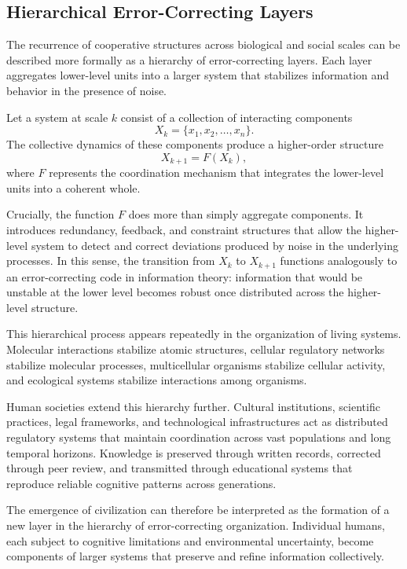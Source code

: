 \documentclass[12pt]{article}
\begin{document}
\subsection{Hierarchical Error-Correcting Layers}

The recurrence of cooperative structures across biological and social scales can be described more formally as a hierarchy of error-correcting layers. Each layer aggregates lower-level units into a larger system that stabilizes information and behavior in the presence of noise.

Let a system at scale $k$ consist of a collection of interacting components
\[
X_k = \{x_1, x_2, \dots, x_n\}.
\]
The collective dynamics of these components produce a higher-order structure
\[
X_{k+1} = F(X_k),
\]
where $F$ represents the coordination mechanism that integrates the lower-level units into a coherent whole.

Crucially, the function $F$ does more than simply aggregate components. It introduces redundancy, feedback, and constraint structures that allow the higher-level system to detect and correct deviations produced by noise in the underlying processes. In this sense, the transition from $X_k$ to $X_{k+1}$ functions analogously to an error-correcting code in information theory: information that would be unstable at the lower level becomes robust once distributed across the higher-level structure.

This hierarchical process appears repeatedly in the organization of living systems. Molecular interactions stabilize atomic structures, cellular regulatory networks stabilize molecular processes, multicellular organisms stabilize cellular activity, and ecological systems stabilize interactions among organisms.

Human societies extend this hierarchy further. Cultural institutions, scientific practices, legal frameworks, and technological infrastructures act as distributed regulatory systems that maintain coordination across vast populations and long temporal horizons. Knowledge is preserved through written records, corrected through peer review, and transmitted through educational systems that reproduce reliable cognitive patterns across generations.

The emergence of civilization can therefore be interpreted as the formation of a new layer in the hierarchy of error-correcting organization. Individual humans, each subject to cognitive limitations and environmental uncertainty, become components of larger systems that preserve and refine information collectively.
\end{document}
